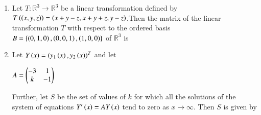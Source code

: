 \documentclass[journal]{IEEEtran}
\begin{document}
\begin{enumerate}
\begin{enumerate}
\end{enumerate}
\item Let $T: \mathbb{R}^3 \rightarrow \mathbb{R}^3$ be a linear transformation defined by $T\left(\left(x, y, z\right)\right) = \left(x + y - z, x + y + z, y - z\right)$.Then the matrix of the linear transformation $T$ with respect to the ordered basis $B = \left\{\left(0, 1, 0\right), \left(0, 0, 1\right), \left(1, 0, 0\right)\right\}$ of $\mathbb{R}^3$ is  
\begin{enumerate}
\end{enumerate}
\item Let $Y\left(x\right) = \left(y_1\left(x\right), y_2\left(x\right)\right)^T$ and let \\ \begin{center}$A = \begin{pmatrix}-3 & 1 \\k & -1\end{pmatrix}$ \end{center}Further, let $S$ be the set of values of $k$ for which all the solutions of the system of equations $Y^{\prime}\left(x\right) = A Y\left(x\right)$ tend to zero as $x \rightarrow \infty$. Then $S$ is given by
\begin{enumerate}
\begin{multicols}{2}

\end{multicols}
\end{enumerate}
\end{enumerate}
\end{document}
